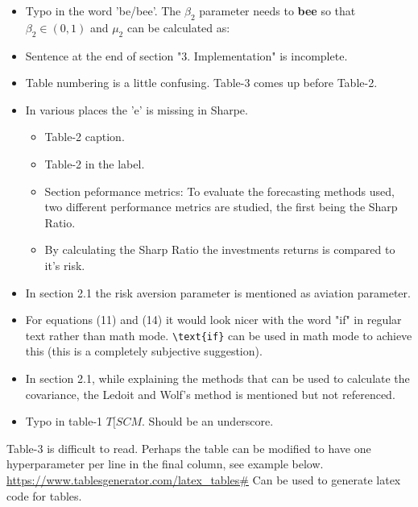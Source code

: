 \documentclass[a4paper,11pt]{article}
\begin{document}
\begin{itemize}
	\item Typo in the word 'be/bee'. The $\beta_2$ parameter needs to \textbf{bee} so that $\beta_2 \in (0, 1)$ and $\mu_2$ can be calculated as:
	
	\item Sentence at the end of section "3. Implementation" is incomplete.
	
	\item Table numbering is a little confusing. Table-3 comes up before Table-2.
	
	\item In various places the 'e' is missing in Sharpe. 
	\begin{itemize}
		\item Table-2 caption.
		
		\item Table-2 in the label.
		
		\item Section peformance metrics: To evaluate the forecasting methods used, two different performance metrics are studied, the first being the Sharp Ratio.
		
		\item By calculating the Sharp Ratio the investments returns is compared to it’s risk.	
	\end{itemize}
	
	\item In section 2.1 the risk aversion parameter is mentioned as aviation parameter.


	\item For equations (11) and (14) it would look nicer with the word "if" in regular text rather than math mode. \verb'\text{if}' can be used in math mode to achieve this (this is a completely subjective suggestion).
	
	\item In section 2.1, while explaining the methods that can be used to calculate the covariance, the Ledoit and Wolf’s method is mentioned but not referenced.
	
	\item Typo in table-1 $T[SCM$. Should be an underscore.
\end{itemize}


Table-3 is difficult to read.
Perhaps the table can be modified to have one hyperparameter per line in the final column, see example below.
\url{https://www.tablesgenerator.com/latex_tables#}
Can be used to generate latex code for tables.
\end{document}

